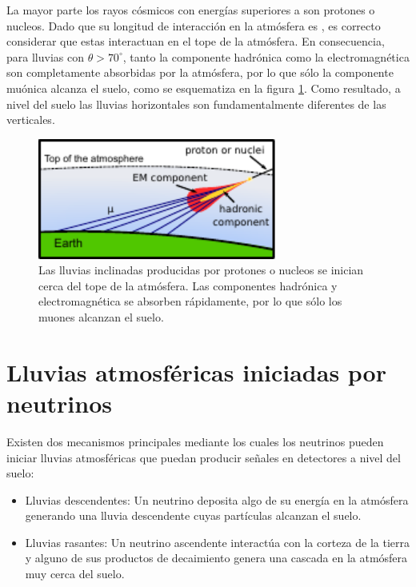 La mayor parte los rayos cósmicos con energías superiores a  son protones o nucleos.
Dado que su longitud de interacción en la atmósfera es , es correcto considerar que estas interactuan en el tope de la atmósfera.
En consecuencia, para lluvias con $\theta>70^\circ$, tanto la componente hadrónica como la electromagnética son completamente absorbidas por la atmósfera, por lo que sólo la componente muónica alcanza el suelo, como se esquematiza en la figura \ref{fig:horizontalHad}.
Como resultado, a nivel del suelo las lluvias horizontales son fundamentalmente diferentes de las verticales.
%
\begin{figure}[h!]
\begin{center}
\includegraphics[width=0.7\textwidth]{fig/EASAuger/horizontal2_english.pdf}
\caption{Las lluvias inclinadas producidas por protones o nucleos se inician cerca del tope de la atmósfera.
Las componentes hadrónica y electromagnética se absorben rápidamente, por lo que sólo los muones alcanzan el suelo.
}
\label{fig:horizontalHad}
\end{center}
\end{figure}

\section{Lluvias atmosf\'ericas iniciadas por neutrinos}
\label{sc:easNu}

Existen dos mecanismos principales mediante los cuales los neutrinos pueden iniciar lluvias atmosféricas que puedan producir señales en detectores a nivel del suelo:
\begin{itemize}
 \item Lluvias descendentes: Un neutrino deposita algo de su energía en la atmósfera generando una lluvia descendente cuyas partículas alcanzan el suelo.
 \item Lluvias rasantes: Un neutrino ascendente interactúa con la corteza de la tierra y alguno de sus productos de decaimiento genera una cascada en la atmósfera muy cerca del suelo.
\end{itemize}

